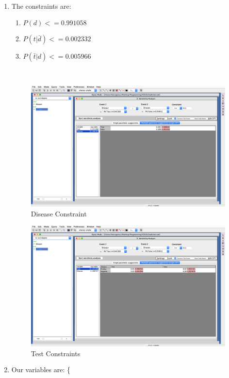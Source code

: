 \documentclass{article}
\begin{document}
\begin{enumerate}
	\item The constraints are: 
				\begin{enumerate}
					\item $P(d) <= 0.991058$
					\item $P(t | \bar d) <= 0.002332$
					\item $P(\bar t | d) <= 0.005966$
				\end{enumerate} \
		\begin{figure}[H]
			\centering
			\includegraphics[width=\linewidth]{diseaseweight.png}
			\caption{Disease Constraint}
			\label{fig:dis}
		\end{figure}
		\begin{figure}[H]
			\centering
			\includegraphics[width=\linewidth]{testweight.png}
			\caption{Test Constraints}
			\label{fig:test}
		\end{figure}
	\clearpage
	\item Our variables are: \{\\

\end{enumerate}
\end{document}
